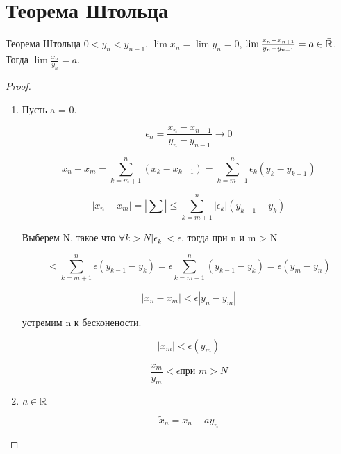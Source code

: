 ﻿\section{Теорема Штольца}

\begin{theorem}{Теорема Штольца}
$0<y_n<y_{n-1}$, $\lim x_n = \lim y_n = 0$, $\lim \frac{x_n-x_{n+1}}{y_n-y_{n+1}} = a \in \bar{\mathbb{R}}$.
Тогда $\lim \frac{x_n}{y_n} = a$.
\end{theorem}
\begin{proof}
\begin{enumerate}
\item Пусть a = 0.

$$\epsilon_n = \frac{x_n - x_{n - 1}}{y_n - y_{n - 1}} \to 0$$

$$x_n - x_m = \sum_{k = m + 1}^{n}(x_k - x_{k - 1}) = \sum_{k = m + 1}^{n}\epsilon_k(y_k - y_{k - 1})$$

$$|x_n - x_m| = |\sum| \le \sum_{k = m + 1}^{n}|\epsilon_k|(y_{k - 1} - y_k)$$

Выберем N, такое что $\forall k > N |\epsilon_k| < \epsilon$, тогда при n и m > N 

$$< \sum^{n}_{k = m + 1}\epsilon(y_{k - 1} - y_k) = \epsilon\sum_{k = m + 1}^{n}(y_{k - 1} - y_k) = \epsilon(y_m - y_n)$$

$$|x_n - x_m| < \epsilon|y_n - y_m|$$

устремим n  к бесконености.

$$|x_m| < \epsilon(y_m)$$

$$\frac{x_m}{y_m} < \epsilon \text{при $m > N$}$$

\item $a \in \mathbb{R}$

$$\tilde x_n = x_n - a y_n$$
\end{enumerate}
\end{proof}
